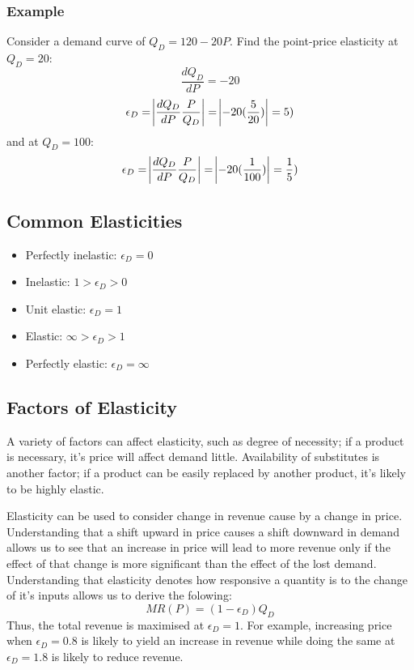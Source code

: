 \documentclass[12pt]{report}
\begin{document}
\subsubsection*{Example}
Consider a demand curve of \(Q_D = 120 - 20P\). Find the point-price elasticity at \(Q_D = 20\):
\[\frac{dQ_D}{dP} = -20\]
\[\epsilon_D = \abs{\frac{dQ_D}{dP}\frac{P}{Q_D}} = \abs{-20(\frac{5}{20})} = 5)\]
and at \(Q_D = 100\):
\[\epsilon_D = \abs{\frac{dQ_D}{dP}\frac{P}{Q_D}} = \abs{-20(\frac{1}{100})} = \frac{1}{5})\]

\subsection*{Common Elasticities}
\begin{itemize}
    \item Perfectly inelastic: \(\epsilon_D = 0\)
    \item Inelastic: \(1 > \epsilon_D > 0\)
    \item Unit elastic: \(\epsilon_D = 1\)
    \item Elastic: \(\infty > \epsilon_D > 1\)
    \item Perfectly elastic: \(\epsilon_D = \infty\)
\end{itemize}

\subsection*{Factors of Elasticity}
A variety of factors can affect elasticity, such as degree of necessity; if a product is necessary,
it's price will affect demand little. Availability of substitutes is another factor; if a product
can be easily replaced by another product, it's likely to be highly elastic.

\bigskip
Elasticity can be used to consider change in revenue cause by a change in price. Understanding that 
a shift upward in price causes a shift downward in demand allows us to see that an increase in 
price will lead to more revenue only if the effect of that change is more significant than the 
effect of the lost demand. Understanding that elasticity denotes how responsive a quantity is 
to the change of it's inputs allows us to derive the folowing:
\[MR(P) = (1 - \epsilon_D)Q_D\]
Thus, the total revenue is maximised at \(\epsilon_D = 1\). For example, increasing price when \(\epsilon_D = 0.8\)
is likely to yield an increase in revenue while doing the same at \(\epsilon_D = 1.8\) is likely to
reduce revenue. 
\end{document}
